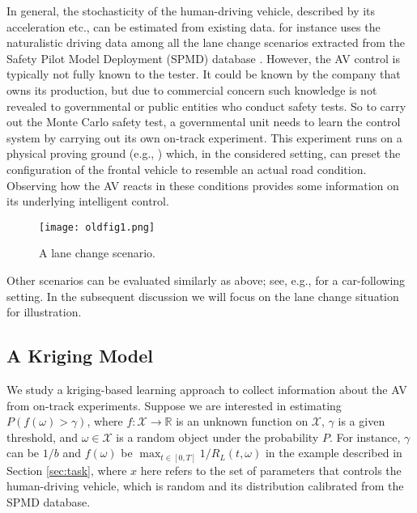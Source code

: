\documentclass{wscpaperproc}
\theoremstyle{wsc}
\begin{document}
In general, the stochasticity of the human-driving vehicle, described by its acceleration etc., can be estimated from existing data.  for instance uses the naturalistic driving data among all the lane change scenarios extracted from the Safety Pilot Model Deployment (SPMD) database \cite{bezzina2014safety}. However, the AV control is typically not fully known to the tester. It could be known by the company that owns its production, but  due to commercial concern such knowledge is not revealed to governmental or public entities who conduct safety tests. So to carry out the Monte Carlo safety test, a governmental unit needs to learn the control system by carrying out its own on-track experiment. This experiment runs on a physical proving ground (e.g., ) which, in the considered setting, can preset the configuration of the frontal vehicle to resemble an actual road condition. Observing how the AV reacts in these conditions provides some information on its underlying intelligent control.
\begin{figure}[ht]
							\centering
							\texttt{[image: oldfig1.png]}
                            \caption{A lane change scenario.}
                            \label{fig:lane}
\end{figure}
            
%

Other scenarios can be evaluated similarly as above; see, e.g.,  for a car-following setting. In the subsequent discussion we will focus on the lane change situation for illustration. 

\subsection{A Kriging Model}\label{sec:kriging}
We study a kriging-based learning approach to collect information about the AV from on-track experiments. Suppose we are interested in estimating $P(f(\omega)>\gamma)$, where $f:\mathcal X\to\mathbb R$ is an unknown function on $\mathcal X$, $\gamma$ is a given threshold, and $\omega\in\mathcal X$ is a random object under the probability $P$. For instance, $\gamma$ can be $1/b$ and $f(\omega)$ be $\max_{t\in[0,T]}1/R_L(t,\omega)$ in the example described in Section \ref{sec:task}, where $x$ here refers to the set of parameters that controls the human-driving vehicle, which is random and its distribution calibrated from the SPMD database.
\end{document}
